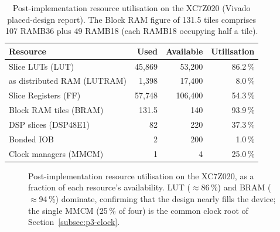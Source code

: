 \begin{table}[H]
\centering
\caption{Post-implementation resource utilisation on the XC7Z020 (Vivado placed-design report). The
Block RAM figure of 131.5 tiles comprises 107 RAMB36 plus 49 RAMB18 (each RAMB18 occupying half a
tile).}
\label{tab:p3-util}
\renewcommand{\arraystretch}{1.2}
\begin{tabular}{@{}lrrr@{}}
\toprule
\textbf{Resource} & \textbf{Used} & \textbf{Available} & \textbf{Utilisation} \\
\midrule
Slice LUTs (LUT)          & 45{,}869 & 53{,}200  & 86.2\,\% \\
\quad as distributed RAM (LUTRAM) & 1{,}398 & 17{,}400 & 8.0\,\% \\
Slice Registers (FF)      & 57{,}748 & 106{,}400 & 54.3\,\% \\
Block RAM tiles (BRAM)    & 131.5    & 140       & 93.9\,\% \\
DSP slices (DSP48E1)      & 82       & 220       & 37.3\,\% \\
Bonded IOB                & 2        & 200       & 1.0\,\% \\
Clock managers (MMCM)     & 1        & 4         & 25.0\,\% \\
\bottomrule
\end{tabular}
\end{table}

\begin{figure}[H]
\centering
{}
\caption{Post-implementation resource utilisation on the XC7Z020, as a fraction of each resource's
availability. LUT ($\approx$86\,\%) and BRAM ($\approx$94\,\%) dominate, confirming that the design
nearly fills the device; the single MMCM (25\,\% of four) is the common clock root of
Section~\ref{subsec:p3-clock}.}
\label{fig:p3-util-bars}
\end{figure}

